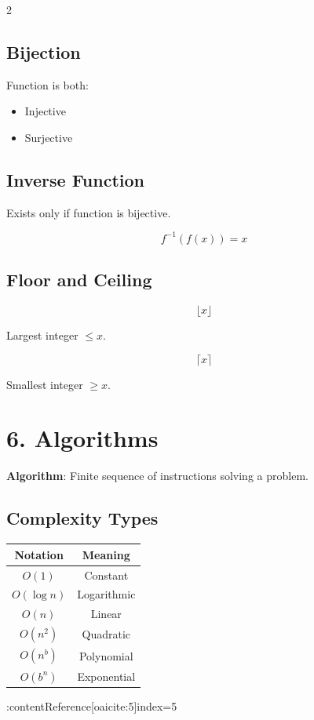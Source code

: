 \documentclass[10pt]{article}
\begin{document}
\begin{multicols}{2}
\subsection*{Bijection}

Function is both:

\begin{itemize}
\item Injective
\item Surjective
\end{itemize}

\subsection*{Inverse Function}

Exists only if function is bijective.

\[
f^{-1}(f(x)) = x
\]

\subsection*{Floor and Ceiling}

\[
\lfloor x \rfloor
\]

Largest integer $\le x$.

\[
\lceil x \rceil
\]

Smallest integer $\ge x$.

\section*{6. Algorithms}

\textbf{Algorithm}: Finite sequence of instructions solving a problem.

\subsection*{Complexity Types}

\begin{tabular}{c|c}
Notation & Meaning \\
\hline
$O(1)$ & Constant \\
$O(\log n)$ & Logarithmic \\
$O(n)$ & Linear \\
$O(n^2)$ & Quadratic \\
$O(n^b)$ & Polynomial \\
$O(b^n)$ & Exponential
\end{tabular}

:contentReference[oaicite:5]{index=5}


\end{multicols}
\end{document}
